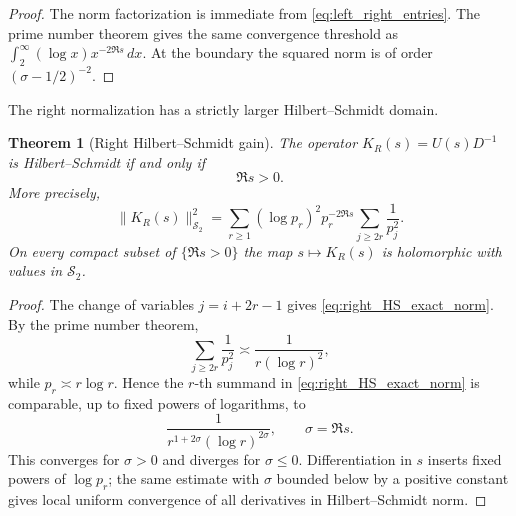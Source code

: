 \documentclass[11pt]{amsart}
\numberwithin{equation}{section}
\theoremstyle{plain}
\newtheorem{theorem}{Theorem}[section]
\theoremstyle{definition}
\theoremstyle{remark}
\newcommand{\HS}{\mathcal S_2}
\begin{document}
\begin{proof}
The norm factorization is immediate from \eqref{eq:left_right_entries}.  The prime number theorem gives the same convergence threshold as $\int_2^\infty (\log x)x^{-2\Re s}\,dx$.  At the boundary the squared norm is of order $(\sigma-1/2)^{-2}$.
\end{proof}

The right normalization has a strictly larger Hilbert--Schmidt domain.

\begin{theorem}[Right Hilbert--Schmidt gain]
\label{thm:right_HS_gain}
The operator $K_R(s)=U(s)D^{-1}$ is Hilbert--Schmidt if and only if
\begin{equation}
\Re s>0.
\label{eq:right_HS_half_plane}
\end{equation}
More precisely,
\begin{equation}
\|K_R(s)\|_{\HS}^2
=\sum_{r\ge1}(\log p_r)^2p_r^{-2\Re s}
\sum_{j\ge2r}\frac1{p_j^2}.
\label{eq:right_HS_exact_norm}
\end{equation}
On every compact subset of $\{\Re s>0\}$ the map $s\mapsto K_R(s)$ is holomorphic with values in $\HS$.
\end{theorem}

\begin{proof}
The change of variables $j=i+2r-1$ gives \eqref{eq:right_HS_exact_norm}.  By the prime number theorem,
\begin{equation}
\sum_{j\ge2r}\frac1{p_j^2}
\asymp\frac1{r(\log r)^2},
\label{eq:prime_square_tail}
\end{equation}
while $p_r\asymp r\log r$.  Hence the $r$-th summand in \eqref{eq:right_HS_exact_norm} is comparable, up to fixed powers of logarithms, to
\begin{equation}
\frac1{r^{1+2\sigma}(\log r)^{2\sigma}},
\qquad \sigma=\Re s.
\label{eq:right_HS_comparison}
\end{equation}
This converges for $\sigma>0$ and diverges for $\sigma\le0$.  Differentiation in $s$ inserts fixed powers of $\log p_r$; the same estimate with $\sigma$ bounded below by a positive constant gives local uniform convergence of all derivatives in Hilbert--Schmidt norm.
\end{proof}
\end{document}
